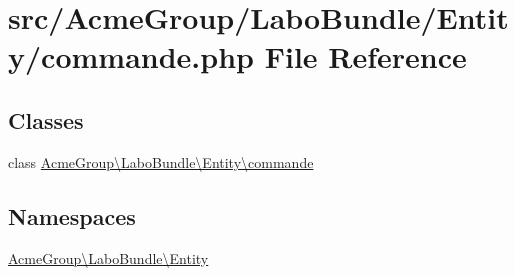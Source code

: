 \hypertarget{commande_8php}{\section{src/\+Acme\+Group/\+Labo\+Bundle/\+Entity/commande.php File Reference}
\label{commande_8php}
}
\subsection*{Classes}
\begin{DoxyCompactItemize}
\item 
class \hyperlink{class_acme_group_1_1_labo_bundle_1_1_entity_1_1commande}{Acme\+Group\textbackslash{}\+Labo\+Bundle\textbackslash{}\+Entity\textbackslash{}commande}
\end{DoxyCompactItemize}
\subsection*{Namespaces}
\begin{DoxyCompactItemize}
\item 
 \hyperlink{namespace_acme_group_1_1_labo_bundle_1_1_entity}{Acme\+Group\textbackslash{}\+Labo\+Bundle\textbackslash{}\+Entity}
\end{DoxyCompactItemize}
